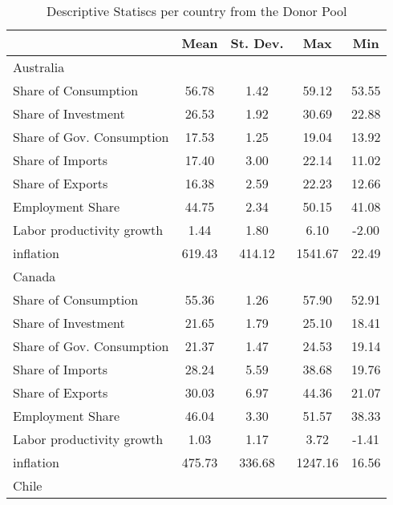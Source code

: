 {
\def\sym#1{\ifmmode^{#1}\else\(^{#1}\)\fi}
\begin{longtable}{l*{1}{cccc}}
\caption{Descriptive Statiscs per country from the Donor Pool}\\
\hline\hline\endfirsthead\hline\endhead\hline\endfoot\endlastfoot
                    &        Mean&    St. Dev.&         Max&         Min\\
\hline
Australia           &            &            &            &            \\
Share of Consumption&       56.78&        1.42&       59.12&       53.55\\
Share of Investment &       26.53&        1.92&       30.69&       22.88\\
Share of Gov. Consumption&       17.53&        1.25&       19.04&       13.92\\
Share of Imports    &       17.40&        3.00&       22.14&       11.02\\
Share of Exports    &       16.38&        2.59&       22.23&       12.66\\
Employment Share    &       44.75&        2.34&       50.15&       41.08\\
Labor productivity growth&        1.44&        1.80&        6.10&       -2.00\\
inflation           &      619.43&      414.12&     1541.67&       22.49\\
Canada              &            &            &            &            \\
Share of Consumption&       55.36&        1.26&       57.90&       52.91\\
Share of Investment &       21.65&        1.79&       25.10&       18.41\\
Share of Gov. Consumption&       21.37&        1.47&       24.53&       19.14\\
Share of Imports    &       28.24&        5.59&       38.68&       19.76\\
Share of Exports    &       30.03&        6.97&       44.36&       21.07\\
Employment Share    &       46.04&        3.30&       51.57&       38.33\\
Labor productivity growth&        1.03&        1.17&        3.72&       -1.41\\
inflation           &      475.73&      336.68&     1247.16&       16.56\\
Chile               &            &            &            &            \\

\end{longtable}}
